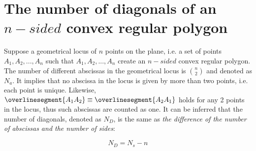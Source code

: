\documentclass[10pt,a4paper]{article}
\begin{document}
\newpage

\section{The number of diagonals of an $n-sided$ convex regular polygon}

Suppose a geometrical locus of $n$ points on the plane, 
i.e. a set of points $A_1, A_2, ..., A_n$ 
such that $A_1, A_2, ..., A_n$ create an $n-sided$ convex regular polygon.
The number of different abscissas in the geometrical locus is ${n \choose 2}$ 
and denoted as $N_a$. It implies that no abscissa in the locus is given by more than two points, 
i.e. each point is unique. Likewise, $\overlinesegment{A_1A_2} \equiv \overlinesegment{A_2A_1}$ 
holds for any 2 points in the locus, thus such abscissas are counted as one. It can be inferred 
that the number of diagonals, denoted as $N_D$, is the same as \textit{the difference of the number of 
abscissas and the number of sides}: 

$$N_D = N_s - n$$
\end{document}
